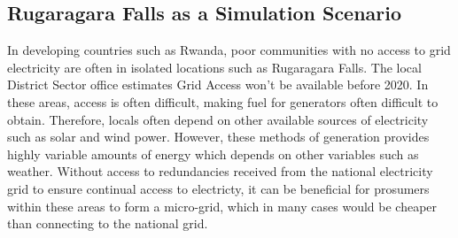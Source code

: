 \subsection*{Rugaragara Falls as a Simulation Scenario}
In developing countries such as Rwanda, poor communities with no access to grid electricity are often in isolated locations such as Rugaragara Falls. The local District Sector office estimates Grid Access won't be available before 2020. In these areas, access is often difficult, making fuel for generators often difficult to obtain. Therefore, locals often depend on other available sources of electricity such as solar and wind power. However, these methods of generation provides highly variable amounts of energy which depends on other variables such as weather. Without access to redundancies received from the national electricity grid to ensure continual access to electricty, it can be beneficial for prosumers within these areas to form a micro-grid, which in many cases would be cheaper than connecting to the national grid. %



